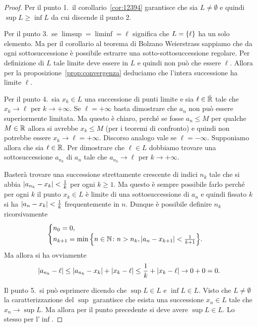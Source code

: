 \begin{proof}
  Per il punto 1.\
  il corollario~\ref{cor:12394} garantisce che sia $L\neq \emptyset$ e
  quindi $\sup L \ge \inf L$ da cui discende il punto 2.

  Per il punto 3.\ se $\limsup = \liminf = \ell$ significa che $L={\left\{ \ell \right\}}$
  ha un solo elemento. Ma per il corollario al teorema di Bolzano Weierstrass
  sappiamo che da ogni sottosuccessione è possibile estrarre una sotto-sottosuccessione
  regolare. Per definizione di $L$ tale limite deve essere in $L$
  e quindi non può che essere $\ell$. Allora per la proposizione~\ref{prop:convergenza}
  deduciamo che l'intera successione ha limite $\ell$.

  Per il punto 4.\ sia $x_k\in L$ una successione di punti limite
  e sia $\ell\in \bar {\mathbb R}$ tale che $x_k \to \ell$ per $k\to +\infty$.
  Se $\ell = +\infty$ basta dimostrare che $a_n$ non può essere superiormente
  limitata. Ma questo è chiaro, perché se fosse $a_n \le M$ per qualche $M\in \mathbb R$
  allora si avrebbe $x_k\le M$ (per i teoremi di confronto) e quindi non potrebbe
  essere $x_k \to \ell=+\infty$. Discorso analogo vale se $\ell = -\infty$.
  Supponiamo allora che sia $\ell \in \mathbb R$.
  Per dimostrare che
  $\ell \in L$ dobbiamo trovare una sottosuccessione $a_{n_k}$ di $a_n$ tale
  che $a_{n_k}\to \ell$ per $k\to +\infty$.

  Basterà trovare una successione strettamente crescente
  di indici $n_k$ tale
  che si abbia ${\left|a_{n_k} - x_k\right|}<\frac 1 {k}$ per ogni
  $k\ge 1$.
  Ma questo è sempre possibile farlo perché per ogni $k$
  il punto $x_k\in L$ è limite di una sottosuccessione di
  $a_n$ e quindi fissato $k$ si ha ${\left|a_n-x_k\right|}<\frac 1 k$
  frequentemente in $n$.
  Dunque è possibile definire $n_k$ ricorsivamente
  \[
   \begin{cases}
    n_0 = 0,\\
    n_{k+1} = \min{\left\{ n\in \mathbb N\colon n>n_k, {\left|a_n-x_{k+1}\right|}<\frac{1}{k+1} \right\}}.
   \end{cases}
  \]
  Ma allora si ha ovviamente
  \[
    {\left|a_{n_k} - \ell\right|}
    \le {\left|a_{n_k} - x_k\right|} + {\left|x_k -\ell\right|}
    \le \frac 1 k + {\left|x_k-\ell\right|} \to 0+0 = 0.
  \]

  Il punto 5.\ si può esprimere dicendo che $\sup L\in L$ e $\inf L \in L$.
  Visto che $L\neq \emptyset$ la caratterizzazione del $\sup$
  garantisce che esista una successione $x_n\in L$ tale che $x_n \to \sup L$.
  Ma allora per il punto precedente si deve avere $\sup L \in L$.
  Lo stesso per l'$\inf$.


\end{proof}
